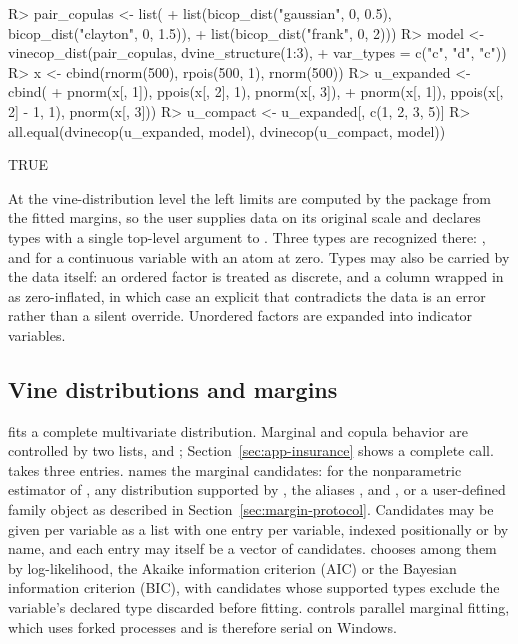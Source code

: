 \documentclass[article]{jss}
\begin{document}
\begin{CodeChunk}
\begin{CodeInput}
R> pair_copulas <- list(
+    list(bicop_dist("gaussian", 0, 0.5), bicop_dist("clayton", 0, 1.5)),
+    list(bicop_dist("frank", 0, 2)))
R> model <- vinecop_dist(pair_copulas, dvine_structure(1:3),
+    var_types = c("c", "d", "c"))
R> x <- cbind(rnorm(500), rpois(500, 1), rnorm(500))
R> u_expanded <- cbind(
+    pnorm(x[, 1]), ppois(x[, 2], 1), pnorm(x[, 3]),
+    pnorm(x[, 1]), ppois(x[, 2] - 1, 1), pnorm(x[, 3]))
R> u_compact <- u_expanded[, c(1, 2, 3, 5)]
R> all.equal(dvinecop(u_expanded, model), dvinecop(u_compact, model))
\end{CodeInput}
\begin{CodeOutput}
[1] TRUE
\end{CodeOutput}
\end{CodeChunk}

At the vine-distribution level the left limits are computed by the package from
the fitted margins, so the user supplies data on its original scale and
declares types with a single top-level  argument to
.  Three types are recognized there: ,  and
 for a continuous variable with an atom at zero.  Types may also be
carried by the data itself: an ordered factor is treated as discrete, and a
column wrapped in  as zero-inflated, in which case an
explicit  that contradicts the data is an error rather than a
silent override.  Unordered factors are expanded into indicator variables.

\subsection{Vine distributions and margins}\label{sec:vine-usage}

 fits a complete multivariate distribution.  Marginal and copula
behavior are controlled by two lists,  and
; Section~\ref{sec:app-insurance} shows a complete
call.   takes three entries.   names the
marginal candidates:  for the nonparametric estimator of
\citet{kde1d}, any distribution supported by 
\citep{univariateML}, the aliases , 
and , or a user-defined family object as described in
Section~\ref{sec:margin-protocol}.  Candidates may be given per variable as a
list with one entry per variable, indexed positionally or by name, and each
entry may itself be a vector of candidates.   chooses among them by log-likelihood, the Akaike information
criterion (AIC) or the Bayesian information criterion (BIC), with candidates
whose supported types exclude the variable's declared type discarded before
fitting.   controls parallel marginal
fitting, which uses forked processes and is therefore serial on Windows.
\end{document}
